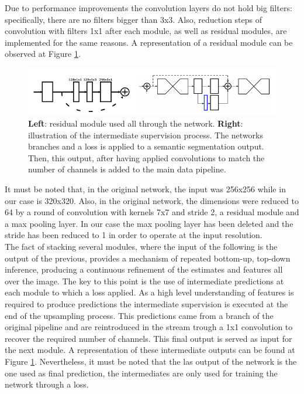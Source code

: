 Due to performance improvements the convolution layers do not hold big filters: specifically, there are no filters bigger than 3x3. Also, reduction steps of convolution with filters 1x1 after each module, as well as residual modules, are implemented for the same reasons. A representation of a residual module can be observed at Figure \ref{hourglass:residual}.\\

\begin{figure}
\centering
\includegraphics[scale=0.7]{residual.png}
\caption{\textbf{Left}: residual module used all through the network. \textbf{Right}: illustration of the intermediate supervision process. The  networks branches and a loss is applied to a semantic segmentation output. Then, this output, after having applied convolutions to match the number of channels is added to the main data pipeline. }
\label{hourglass:residual}
\end{figure}

It must be noted that, in the original network, the input was 256x256 while in our case is 320x320. Also, in the original network, the dimensions were reduced to 64 by a round of convolution with kernels 7x7 and stride 2, a residual module and a max pooling layer. In our case the max pooling layer has been deleted and the stride has been reduced to 1 in order to operate at the input resolution.\\

The fact of stacking several modules, where the input of the following is the output of the previous, provides a mechanism of repeated bottom-up, top-down inference, producing a continuous refinement of the estimates and features all over the image. The key to this point is the use of intermediate predictions at each module to which a loss applied. As a high level understanding of features is required to produce predictions the intermediate supervision is executed at the end of the upsampling process. This predictions came from a branch of the original pipeline and are reintroduced in the stream trough a 1x1 convolution to recover the required number of channels. This final output is served as input for the next module. A representation of these intermediate outputs can be found at Figure \ref{hourglass:residual}. Nevertheless, it must be noted that the las output of the network is the one used as final prediction, the intermediates are only used for training the network through a loss.\\

